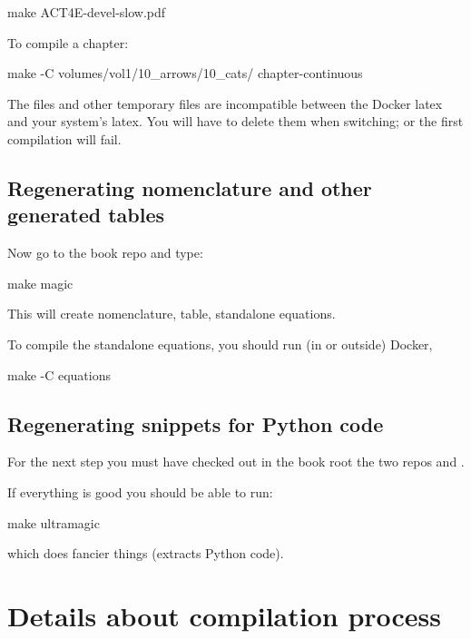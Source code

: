 \begin{console}
    make ACT4E-devel-slow.pdf
\end{console}

To compile a chapter:

\begin{console}
    make -C volumes/vol1/10_arrows/10_cats/ chapter-continuous
\end{console}

\begin{remark}
    The  files and other temporary files are incompatible between the Docker latex and your system's latex.
    You will have to delete them when switching; or the first compilation will fail.
\end{remark}

\subsection{Regenerating nomenclature and other generated tables}

Now go to the book repo and type:

\begin{console}
    make magic
\end{console}

This will create nomenclature, table, standalone equations.

To compile the standalone equations, you should run (in or outside) Docker,

\begin{console}
    make -C equations
\end{console}

\subsection{Regenerating snippets for Python code}

For the next step you must have checked out in the book root the two repos
 and .

If everything is good you should be able to run:
\begin{console}
    make ultramagic
\end{console}
which does fancier things (extracts Python code).

\section{Details about compilation process}

